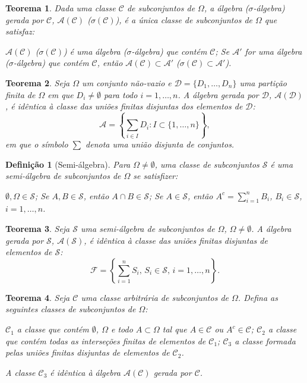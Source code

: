 \documentclass[12pt,a4paper,answers]{article}
\numberwithin{equation}{section} %
\newcommand{\Acal}{\mathcal{A}}
\newcommand{\Ccal}{\mathcal{C}}
\newcommand{\Dcal}{\mathcal{D}}
\newcommand{\Fcal}{\mathcal{F}}
\newcommand{\Scal}{\mathcal{S}}
\theoremstyle{thm_estilo}
\newtheorem{theorem}{Teorema}[section]
\newtheorem{definition}{Definição}[section]
\theoremstyle{thm_note_est}
\begin{document}
\begin{theorem}
	Dada uma classe $\Ccal$ de subconjuntos de $\Omega$, a álgebra ($\sigma$-álgebra) gerada por $\Ccal$, $\Acal(\Ccal)$ ($\sigma(\Ccal)$), é a única classe de subconjuntos de $\Omega$ que satisfaz:
	\begin{outline}[enumerate]
		\1 $\Acal(\Ccal)$ ($\sigma(\Ccal)$) é uma álgebra ($\sigma$-álgebra) que contém $\Ccal$;
		\1 Se $\Acal'$ for uma álgebra ($\sigma$-álgebra) que contém $\Ccal$, então $\Acal(\Ccal) \subset \Acal'$ ($\sigma(\Ccal) \subset \Acal'$).
	\end{outline}
\end{theorem}

\begin{theorem}
	Seja $\Omega$ um conjunto não-vazio e $\Dcal = \{D_1, \ldots, D_n\}$ uma partição finita de $\Omega$ em que $D_i \neq \emptyset$ para todo $i = 1, \ldots, n$. A álgebra gerada por $\Dcal$, $\Acal(\Dcal)$, é idêntica à classe das uniões finitas disjuntas dos elementos de $\Dcal$:
	\[
	\Acal = \left\{ \sum_{i \in I} D_i : I \subset \{1, \ldots, n\} \right\},
	\]
	em que o símbolo $\sum$ denota uma união disjunta de conjuntos.
\end{theorem}

\begin{definition}[Semi-álgebra]
	Para $\Omega \neq \emptyset$, uma classe de subconjuntos $\Scal$ é uma semi-álgebra de subconjuntos de $\Omega$ se satisfizer:
	\begin{outline}[enumerate]
		\1 $\emptyset, \Omega \in \Scal$;
		\1 Se $A, B \in \Scal$, então $A \cap B \in \Scal$;
		\1 Se $A \in \Scal$, então $A^c = \sum_{i=1}^{n} B_i$, $B_i \in \Scal$, $i = 1, \ldots, n$.
	\end{outline}
\end{definition}

\begin{theorem}
	Seja $\Scal$ uma semi-álgebra de subconjuntos de $\Omega$, $\Omega \neq \emptyset$. A álgebra gerada por $\Scal$, $\Acal(\Scal)$, é idêntica à classe das uniões finitas disjuntas de elementos de $\Scal$:
	\[
	\Fcal = \left\{ \sum_{i=1}^{n} S_i, \, S_i \in \Scal, \, i = 1, \ldots, n \right\}.
	\]
\end{theorem}

\begin{theorem}
	Seja $\Ccal$ uma classe arbitrária de subconjuntos de $\Omega$. Defina as seguintes classes de subconjuntos de $\Omega$:
	\begin{outline}[enumerate]
		\1 $\Ccal_1$ a classe que contém $\emptyset$, $\Omega$ e todo $A \subset \Omega$ tal que $A \in \Ccal$ ou $A^c \in \Ccal$;
		\1 $\Ccal_2$ a classe que contém todas as interseções finitas de elementos de $\Ccal_1$;
		\1 $\Ccal_3$ a classe formada pelas uniões finitas disjuntas de elementos de $\Ccal_2$.
	\end{outline}
	A classe $\Ccal_3$ é idêntica à álgebra $\Acal(\Ccal)$ gerada por $\Ccal$.
\end{theorem}
\end{document}
